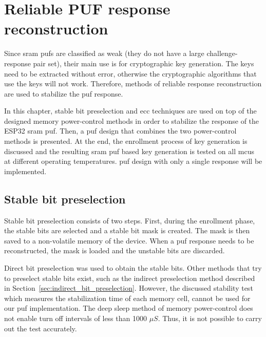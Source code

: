 \chapter{Reliable PUF response reconstruction}\label{sec:response_extraction} %

Since \gls{sram} \glspl{puf} are classified as weak (they do not have a large challenge-response pair set), their main use is for cryptographic key generation. The keys need to be extracted without error, otherwise the cryptographic algorithms that use the keys will not work. Therefore, methods of reliable response reconstruction are used to stabilize the \gls{puf} response.

In this chapter, stable bit preselection and \gls{ecc} techniques are used on top of the designed memory power-control methods in order to stabilize the response of the ESP32 \gls{sram} \gls{puf}. Then, a \gls{puf} design that combines the two power-control methods is presented. At the end, the enrollment process of key generation is discussed and the resulting \gls{sram} \gls{puf} based key generation is tested on all \glspl{mcu} at different operating temperatures. \gls{puf} design with only a single response will be implemented.

\section{Stable bit preselection}

Stable bit preselection consists of two steps. First, during the enrollment phase, the stable bits are selected and a stable bit mask is created. The mask is then saved to a non-volatile memory of the device. When a \gls{puf} response needs to be reconstructed, the mask is loaded and the unstable bits are discarded.

Direct bit preselection was used to obtain the stable bits. Other methods that try to preselect stable bits exist, such as the indirect preselection method described in Section~\ref{sec:indirect_bit_preselection}. However, the discussed stability test which measures the stabilization time of each memory cell, cannot be used for our \gls{puf} implementation. The deep sleep method of memory power-control does not enable turn off intervals of less than 1000 $\mu{}S$. Thus, it is not possible to carry out the test accurately.

